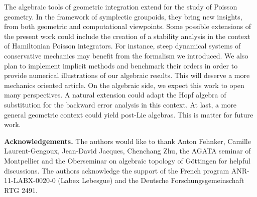 \documentclass[a4paper,11pt]{article}
\begin{document}
The algebraic tools of geometric integration extend for the study of Poisson geometry. In the framework of symplectic groupoids, they bring new insights, from both geometric and computational viewpoints.
Some possible extensions of the present work could include the creation of a stability analysis in the context of Hamiltonian Poisson integrators. For instance, steep dynamical systems of conservative mechanics may benefit from the formalism we introduced. We also plan to implement implicit methods and benchmark their orders in order to provide numerical illustrations of our algebraic results. This will deserve a more mechanics oriented article.
On the algebraic side, we expect this work to open many perspectives. A natural extension could adapt the Hopf algebra of substitution for the backward error analysis in this context. At last, a more general geometric context could yield post-Lie algebras.
This is matter for future work.




\bigskip

\noindent \textbf{Acknowledgements.}
The authors would like to thank Anton Fehnker, Camille Laurent-Gengoux, Jean-David Jacques, Chenchang Zhu, the AGATA seminar of Montpellier and the Oberseminar on algebraic topology of Göttingen for helpful discussions.
The authors acknowledge the support of the French program ANR-11-LABX-0020-0 (Labex Lebesgue) and the Deutsche Forschungsgemeinschaft RTG 2491.








\end{document}
